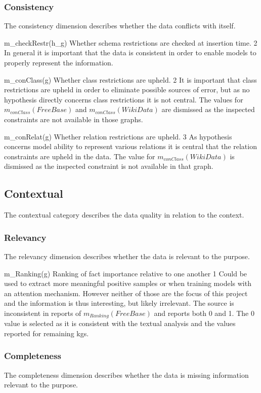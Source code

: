 \subsubsection{Consistency}
The consistency dimension describes whether the data conflicts with itself.

\weighttable
{m_{checkRestr}(h_g)}
{Whether schema restrictions are checked at insertion time.}
{2}
{In general it is important that the data is consistent in order to enable models to properly represent the information.}
{}

\weighttable
{m_{conClass}(g)}
{Whether class restrictions are upheld.}
{2}
{It is important that class restrictions are upheld in order to eliminate possible sources of error, but as no hypothesis directly concerns class restrictions it is not central.}
{The values for $m_{conClass}(FreeBase)$ and $m_{conClass}(WikiData)$ are dismissed as the inspected constraints are not available in those graphs.}

\weighttable
{m_{conRelat}(g)}
{Whether relation restrictions are upheld.}
{3}
{As hypothesis \missing concerns model ability to represent various relations it is central that the relation constraints are upheld in the data.}
{The value for $m_{conClass}(WikiData)$ is dismissed as the inspected constraint is not available in that graph.}

\subsection{Contextual}
The contextual category describes the data quality in relation to the context.

\subsubsection{Relevancy}
The relevancy dimension describes whether the data is relevant to the purpose.

\weighttable
{m_{Ranking}(g)}
{Ranking of fact importance relative to one another}
{1}
{Could be used to extract more meaningful positive samples or when training models with an attention mechanism. However neither of those are the focus of this project and the information is thus interesting, but likely irrelevant.}
{The source is inconsistent in reports of $m_{Ranking}(FreeBase)$ and reports both 0 and 1. The 0 value is selected as it is consistent with the textual analysis and the values reported for remaining \glspl{kg}.}

\subsubsection{Completeness}
The completeness dimension describes whether the data is missing information relevant to the purpose.

